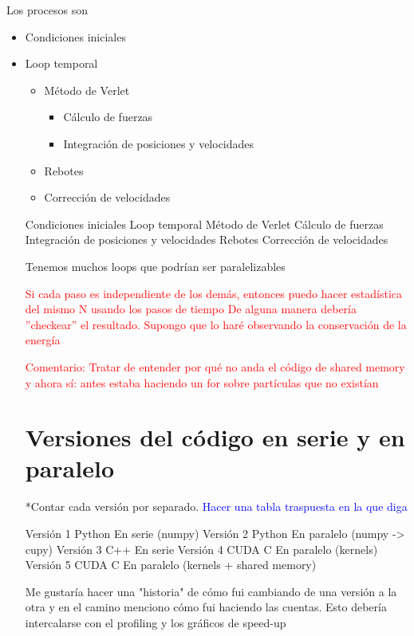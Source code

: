 \documentclass[aps,prb,twocolumn,superscriptaddress,floatfix,longbibliography]{revtex4-2}
\newcounter{para}
\begin{document}
Los procesos son
\begin{itemize}
    \item Condiciones iniciales
    \item Loop temporal
    \begin{itemize}
        \item Método de Verlet
        \begin{itemize}
            \item Cálculo de fuerzas
            \item Integración de posiciones y velocidades
        \end{itemize}
        \item Rebotes
        \item Corrección de velocidades
    \end{itemize}


Condiciones iniciales
Loop temporal
Método de Verlet
Cálculo de fuerzas
Integración de posiciones y velocidades
Rebotes
Corrección de velocidades




Tenemos muchos loops que podrían ser paralelizables



\textcolor{red}{Si cada paso es independiente de los demás, entonces puedo hacer estadística del mismo N usando los pasos de tiempo}
\textcolor{red}{De alguna manera debería ''checkear'' el resultado. Supongo que lo haré observando la conservación de la energía}


\textcolor{red}{Comentario: Tratar de entender por qué no anda el código de shared memory y ahora sí: antes estaba haciendo un for sobre partículas que no existían}

\section{Versiones del código en serie y en paralelo}
*Contar cada versión por separado.
\textcolor{blue}{Hacer una tabla traspuesta en la que diga}

Versión 1	Python	En serie (numpy)
Versión 2	Python	En paralelo (numpy -> cupy)
Versión 3	C++	En serie
Versión 4	CUDA C	En paralelo (kernels)
Versión 5	CUDA C	En paralelo (kernels + shared memory)

Me gustaría hacer una "historia" de cómo fui cambiando de una versión a la otra y en el camino menciono cómo fui haciendo las cuentas. Esto debería intercalarse con el profiling y los gráficos de speed-up


\end{itemize}
\end{document}
